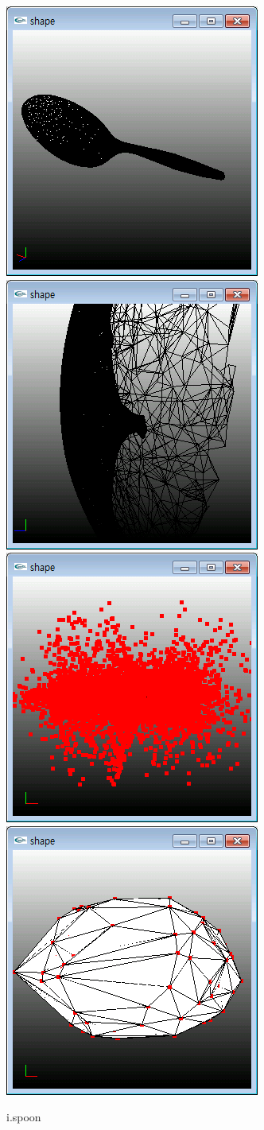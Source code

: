 \documentclass[11pt]{article}
\begin{document}
\begin{figure}[ht]
\centering
\includegraphics[width=.23\textwidth]{FIGS/spoon1}
\hspace{0.2cm}
\includegraphics[width=.23\textwidth]{FIGS/spoon2}
\hspace{0.2cm}
\includegraphics[width=.23\textwidth]{FIGS/spoon3}
\hspace{0.2cm}
\includegraphics[width=.23\textwidth]{FIGS/spoon4}
\caption{i.spoon}
\end{figure}
\end{document}

